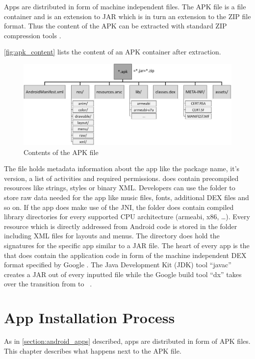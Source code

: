 Apps are distributed in form of machine independent  files.
The APK file is a file container and is an extension to
JAR which is in turn an extension to the ZIP file format.
Thus the content of the APK can be extracted with standard ZIP
compression tools \parencite{securityinternals}.

\autoref{fig:apk_content} lists the content of an APK container
after extraction.
\begin{figure}[htb]
  \includegraphics[width=\textwidth]{figures/apk_content}
  \caption[APK Content]{Contents of the APK file}
  \label{fig:apk_content}
\end{figure}
The  file holds metadata information
about the app like the package name, it's version, a list of
activities and required permissions. 
does contain precompiled resources like strings, styles
or binary XML. Developers can use the  folder
to store raw data needed for the app like music files,
fonts, additional DEX files and so on. If the app does make use of the JNI,
the  folder does contain compiled library directories
for every supported CPU architecture (armeabi, x86, \ldots).
Every resource which is directly addressed from Android code
is stored in the  folder including XML files for
layouts and menus. The  directory does hold
the signatures for the specific app similar to a JAR file.
The heart of every app is the  that does
contain the application code in form of the machine independent
DEX format specified by Google \parencite{dex}. The Java Development
Kit (JDK) tool ``javac'' creates a JAR out of every inputted
  file while the Google build tool ``dx'' takes over
 the transition from  to  ~\parencite{dxtool}.

\section{App Installation Process}\label{section:app_installation}
As in \autoref{section:android_apps} described, apps are distributed
in form of APK files. This chapter describes what happens next to
the APK file.

